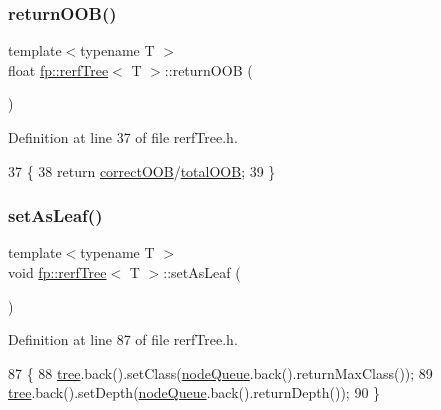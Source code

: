 \subsubsection{\texorpdfstring{return\+O\+O\+B()}{returnOOB()}}
{\footnotesize\ttfamily template$<$typename T $>$ \\
float \hyperlink{classfp_1_1rerfTree}{fp\+::rerf\+Tree}$<$ T $>$\+::return\+O\+OB (\begin{DoxyParamCaption}{ }\end{DoxyParamCaption})\hspace{0.3cm}{\ttfamily [inline]}}



Definition at line 37 of file rerf\+Tree.\+h.


\begin{DoxyCode}
37                                         \{
38                     \textcolor{keywordflow}{return} \hyperlink{classfp_1_1rerfTree_a07330eb1a89870eb8d3c07d0c1af0ec9}{correctOOB}/\hyperlink{classfp_1_1rerfTree_aaac789925d8100bf33cdbb440df8e593}{totalOOB};
39                 \}
\end{DoxyCode}
\mbox{\label{classfp_1_1rerfTree_a85c0f3ee590d5cd8524b0a7e80cffcaf}} 
\subsubsection{\texorpdfstring{set\+As\+Leaf()}{setAsLeaf()}}
{\footnotesize\ttfamily template$<$typename T $>$ \\
void \hyperlink{classfp_1_1rerfTree}{fp\+::rerf\+Tree}$<$ T $>$\+::set\+As\+Leaf (\begin{DoxyParamCaption}{ }\end{DoxyParamCaption})\hspace{0.3cm}{\ttfamily [inline]}}



Definition at line 87 of file rerf\+Tree.\+h.


\begin{DoxyCode}
87                                        \{
88                     \hyperlink{classfp_1_1rerfTree_afc9392154cb4d1dde02e26a9ec31e356}{tree}.back().setClass(\hyperlink{classfp_1_1rerfTree_a59b3bdcba86acbe93fd46658132218a8}{nodeQueue}.back().returnMaxClass());
89                     \hyperlink{classfp_1_1rerfTree_afc9392154cb4d1dde02e26a9ec31e356}{tree}.back().setDepth(\hyperlink{classfp_1_1rerfTree_a59b3bdcba86acbe93fd46658132218a8}{nodeQueue}.back().returnDepth());
90                 \}
\end{DoxyCode}
\mbox{\label{classfp_1_1rerfTree_ae8c63628698cd29fb24cfecf0c2e302e}} 
